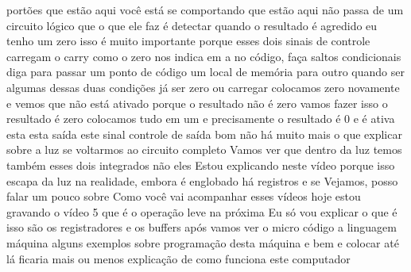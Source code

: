 \documentclass[oneside,11pt]{memoir} %
\begin{document}
portões que estão aqui você está se comportando  que estão aqui não passa de um circuito  lógico que o que ele faz é detectar  quando o resultado é agredido eu tenho  um zero isso é muito importante porque  esses dois sinais de controle carregam  o carry como o zero nos indica em  a  no código, faça saltos condicionais  diga para passar um ponto de código  um local de memória para outro quando  ser algumas dessas duas condições já  ser zero ou carregar colocamos zero novamente  e vemos que não está ativado porque o  resultado não é zero vamos fazer isso  o resultado é zero  colocamos tudo em um  e precisamente o resultado é 0 e é  ativa esta esta saída este sinal  controle de saída bom não há muito mais  o que explicar sobre a luz  se voltarmos ao circuito completo  Vamos ver que dentro da luz temos  também esses dois integrados não eles  Estou explicando neste vídeo porque  isso escapa da luz na realidade, embora  é englobado há registros e se  Vejamos, posso falar um pouco sobre  Como você vai acompanhar esses vídeos hoje estou  gravando o vídeo 5 que é o  operação leve na próxima  Eu só vou explicar o que é isso  são os registradores e os buffers após  vamos ver o micro código a linguagem  máquina alguns exemplos sobre  programação desta máquina e bem e  colocar até lá ficaria mais ou menos  explicação de como funciona  este computador

\end{document}

